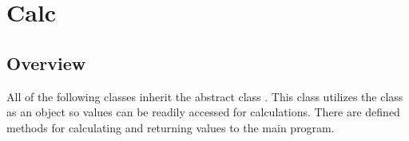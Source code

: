 \documentclass[../Documentation.tex]{subfiles}
\begin{document}
\section{Calc}
\subsection{Overview}
All of the following classes inherit the abstract class . This class utilizes the  class as an object so values can be readily accessed for calculations.
There are defined methods for calculating and returning values to the main program.
\end{document}
